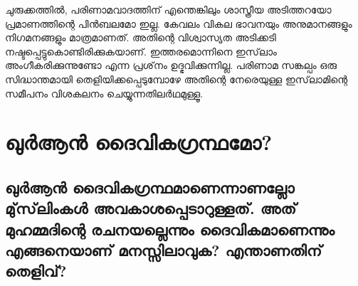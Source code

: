 ചുരുക്കത്തില്‍, പരിണാമവാദത്തിന് എന്തെങ്കിലും ശാസ്ത്രീയ അടിത്തറയോ പ്രമാണത്തിന്റെ പിന്‍ബലമോ ഇല്ല. കേവലം വികല ഭാവനയും അനുമാനങ്ങളും നിഗമനങ്ങളും മാത്രമാണത്. അതിന്റെ വിശ്വാസ്യത അടിക്കടി നഷ്ടപ്പെട്ടുകൊണ്ടിരിക്കുകയാണ്. ഇത്തരമൊന്നിനെ ഇസ്‌ലാം അംഗീകരിക്കുന്നുണ്ടോ എന്ന പ്രശ്‌നം ഉദ്ഭവിക്കുന്നില്ല. പരിണാമ സങ്കല്പം ഒരു സിദ്ധാന്തമായി തെളിയിക്കപ്പെടുമ്പോഴേ അതിന്റെ നേരെയുള്ള ഇസ്‌ലാമിന്റെ സമീപനം വിശകലനം ചെയ്യുന്നതിലര്‍ഥമുള്ളൂ.


\chapter{ഖുര്‍ആന്‍ ദൈവികഗ്രന്ഥമോ? }
 \section{ഖുര്‍ആന്‍ ദൈവികഗ്രന്ഥമാണെന്നാണല്ലോ മു്‌സ്‌ലിംകള്‍ അവകാശപ്പെടാറുള്ളത്. അത് മുഹമ്മദിന്റെ രചനയല്ലെന്നും ദൈവികമാണെന്നും എങ്ങനെയാണ് മനസ്സിലാവുക? എന്താണതിന് തെളിവ്?}

